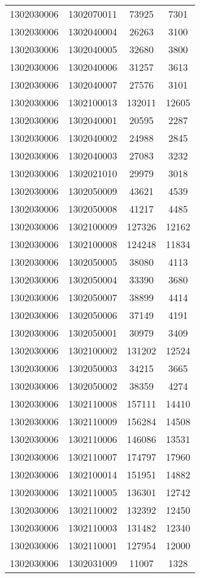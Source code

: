 \begin{longtable}{llcc}
1302030006 & 1302070011 & 73925 & 7301\\
1302030006 & 1302040004 & 26263 & 3100\\
1302030006 & 1302040005 & 32680 & 3800\\
1302030006 & 1302040006 & 31257 & 3613\\
1302030006 & 1302040007 & 27576 & 3101\\
1302030006 & 1302100013 & 132011 & 12605\\
1302030006 & 1302040001 & 20595 & 2287\\
1302030006 & 1302040002 & 24988 & 2845\\
1302030006 & 1302040003 & 27083 & 3232\\
1302030006 & 1302021010 & 29979 & 3018\\
1302030006 & 1302050009 & 43621 & 4539\\
1302030006 & 1302050008 & 41217 & 4485\\
1302030006 & 1302100009 & 127326 & 12162\\
1302030006 & 1302100008 & 124248 & 11834\\
1302030006 & 1302050005 & 38080 & 4113\\
1302030006 & 1302050004 & 33390 & 3680\\
1302030006 & 1302050007 & 38899 & 4414\\
1302030006 & 1302050006 & 37149 & 4191\\
1302030006 & 1302050001 & 30979 & 3409\\
1302030006 & 1302100002 & 131202 & 12524\\
1302030006 & 1302050003 & 34215 & 3665\\
1302030006 & 1302050002 & 38359 & 4274\\
1302030006 & 1302110008 & 157111 & 14410\\
1302030006 & 1302110009 & 156284 & 14508\\
1302030006 & 1302110006 & 146086 & 13531\\
1302030006 & 1302110007 & 174797 & 17960\\
1302030006 & 1302100014 & 151951 & 14882\\
1302030006 & 1302110005 & 136301 & 12742\\
1302030006 & 1302110002 & 132392 & 12450\\
1302030006 & 1302110003 & 131482 & 12340\\
1302030006 & 1302110001 & 127954 & 12000\\
1302030006 & 1302031009 & 11007 & 1328\\

\end{longtable}
